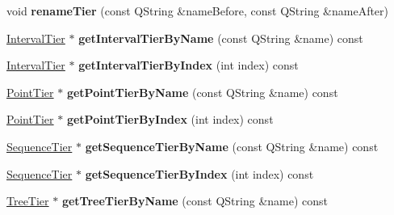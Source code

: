 \begin{DoxyCompactItemize}
\mbox{\label{class_annotation_tier_group_a298ac8f51f3ed8ef502c64c0f707751f}} 
void {\bfseries rename\+Tier} (const Q\+String \&name\+Before, const Q\+String \&name\+After)
\item 
\mbox{\label{class_annotation_tier_group_ad375da2b5d84a63fbf6255c5813a579e}} 
\hyperlink{class_interval_tier}{Interval\+Tier} $\ast$ {\bfseries get\+Interval\+Tier\+By\+Name} (const Q\+String \&name) const
\item 
\mbox{\label{class_annotation_tier_group_a75c8efe087b3158f9c7769a1d1e720de}} 
\hyperlink{class_interval_tier}{Interval\+Tier} $\ast$ {\bfseries get\+Interval\+Tier\+By\+Index} (int index) const
\item 
\mbox{\label{class_annotation_tier_group_a77efe7e0e65f895bf2c3d6d5dc5afe41}} 
\hyperlink{class_point_tier}{Point\+Tier} $\ast$ {\bfseries get\+Point\+Tier\+By\+Name} (const Q\+String \&name) const
\item 
\mbox{\label{class_annotation_tier_group_a1b381a663af16fd87582b7645e6a3b0a}} 
\hyperlink{class_point_tier}{Point\+Tier} $\ast$ {\bfseries get\+Point\+Tier\+By\+Index} (int index) const
\item 
\mbox{\label{class_annotation_tier_group_a5a666bcf4b60f4ea42bfc56e6970207c}} 
\hyperlink{class_sequence_tier}{Sequence\+Tier} $\ast$ {\bfseries get\+Sequence\+Tier\+By\+Name} (const Q\+String \&name) const
\item 
\mbox{\label{class_annotation_tier_group_a71049bb192a09d3dc4cc0d7eddb7d157}} 
\hyperlink{class_sequence_tier}{Sequence\+Tier} $\ast$ {\bfseries get\+Sequence\+Tier\+By\+Index} (int index) const
\item 
\mbox{\label{class_annotation_tier_group_a263bcfc93cd75b6818f54089c7c8d6ac}} 
\hyperlink{class_tree_tier}{Tree\+Tier} $\ast$ {\bfseries get\+Tree\+Tier\+By\+Name} (const Q\+String \&name) const
\item 
\mbox{\label{class_annotation_tier_group_a48c30da8b1807b0fd46fd7da343a7234}} 

\end{DoxyCompactItemize}
